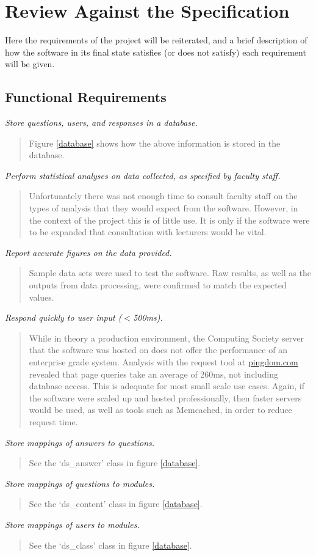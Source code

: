 \documentclass[12pt,a4paper,twoside]{report}
\begin{document}
\section{Review Against the Specification}
Here the requirements of the project will be reiterated, and a brief description of how the software in its final state satisfies (or does not satisfy) each requirement will be given.

\subsection{Functional Requirements}
\textit{Store questions, users, and responses in a database.}
\begin{quote}
Figure \ref{database} shows how the above information is stored in the database.
\end{quote}
\textit{Perform statistical analyses on data collected, as specified by faculty staff.}
\begin{quote}
Unfortunately there was not enough time to consult faculty staff on the types of analysis that they would expect from the software. However, in the context of the project this is of little use. It is only if the software were to be expanded that consultation with lecturers would be vital.
\end{quote}
\textit{Report accurate figures on the data provided.}
\begin{quote}
Sample data sets were used to test the software. Raw results, as well as the outputs from data processing, were confirmed to match the expected values.
\end{quote}
\textit{Respond quickly to user input ($<$500ms).}
\begin{quote}
While in theory a production environment, the Computing Society server that the software was hosted on does not offer the performance of an enterprise grade system. Analysis with the request tool at \url{pingdom.com} revealed that page queries take an average of 260ms, not including database access. This is adequate for most small scale use cases. Again, if the software were scaled up and hosted professionally, then faster servers would be used, as well as tools such as Memcached, in order to reduce request time. 
\end{quote}
\textit{Store mappings of answers to questions.}
\begin{quote}
See the `ds\_answer' class in figure \ref{database}.
\end{quote}
\textit{Store mappings of questions to modules.}
\begin{quote}
See the `ds\_content' class in figure \ref{database}.
\end{quote}
\textit{Store mappings of users to modules.}
\begin{quote}
See the `ds\_class' class in figure \ref{database}.
\end{quote}
\end{document}
